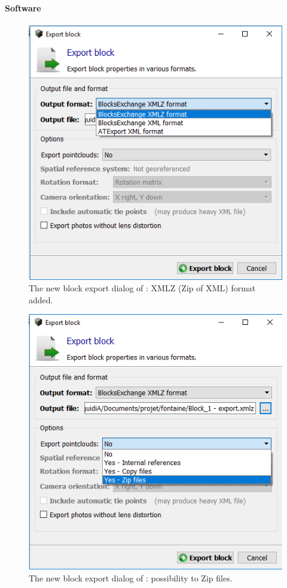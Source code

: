 \paragraph{\CC Software}
\begin{figure}
  \centering
  \includegraphics[scale=0.7]{img/export1.png}
  \caption{The new block export dialog of \CC: XMLZ (Zip of XML) format added.}
  \label{fig:export1}
\end{figure}
\begin{figure}
  \centering
  \includegraphics[scale=0.7]{img/export2.png}
  \caption{The new block export dialog of \CC: possibility to Zip files.}
  \label{fig:export2}
\end{figure}
